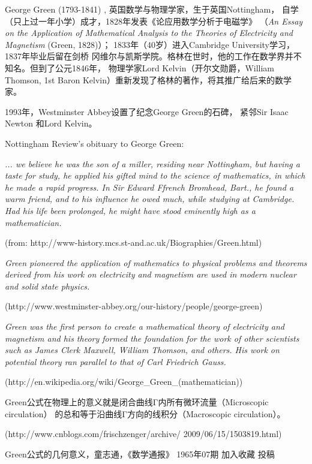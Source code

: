 \begin{shaded}
	George Green (1793-1841) , 英国数学与物理学家，生于英国Nottingham，
	自学（只上过一年小学）成才，1828年发表《论应用数学分析于电磁学》
	（{\it An Essay on the Application of Mathematical Analysis to 
	the Theories of Electricity and Magnetism }(Green, 1828)）；
	1833年（40岁）进入Cambridge University学习，1837年毕业后留在剑桥
	冈维尔与凯斯学院。格林在世时，他的工作在数学界并不知名。但到了公元1846年，
	物理学家Lord Kelvin（开尔文勋爵，William Thomson, 1st Baron 
	Kelvin）重新发现了格林的著作，将其推广给后来的数学家。
	
	\bigskip

	1993年，Westminster Abbey设置了纪念George Green的石碑，
	紧邻Sir Isaac Newton 和Lord Kelvin。
	
	\bigskip
	
	Nottingham Review's obituary to George Green:
	
	{\it ... we believe he was the son of a miller, residing near 
	Nottingham, but having a taste for study, he applied his 
	gifted mind to the science of mathematics, in which he 
	made a rapid progress. In Sir Edward Ffrench Bromhead, 
	Bart., he found a warm friend, and to his influence he 
	owed much, while studying at Cambridge. Had his life been 
	prolonged, he might have stood eminently high as a mathematician.}
	
	\hfill (from: http://www-history.mcs.st-and.ac.uk/Biographies/Green.html)
	
	\bigskip
	
	{\it Green pioneered the application of mathematics to physical 
	problems and theorems derived from his work on electricity 
	and magnetism are used in modern nuclear and solid state physics.}
	
	\hfill (http://www.westminster-abbey.org/our-history/people/george-green)
	
	\bigskip
	
	{\it Green was the first person to create a mathematical theory 
	of electricity and magnetism and his theory formed the foundation 
	for the work of other scientists such as James Clerk Maxwell, 
	William Thomson, and others. His work on potential theory ran 
	parallel to that of Carl Friedrich Gauss.}
	
	\hfill (http://en.wikipedia.org/wiki/George\_Green\_(mathematician))
	
	\bigskip
	
	Green公式在物理上的意义就是闭合曲线Γ内所有微环流量（Microscopic circulation）
	的总和等于沿曲线Γ方向的线积分（Macroscopic circulation）。

	\hfill (http://www.cnblogs.com/frischzenger/archive/
	2009/06/15/1503819.html)

	\bigskip
	Green公式的几何意义，童志通，《数学通报》 1965年07期 加入收藏 投稿
\end{shaded}

